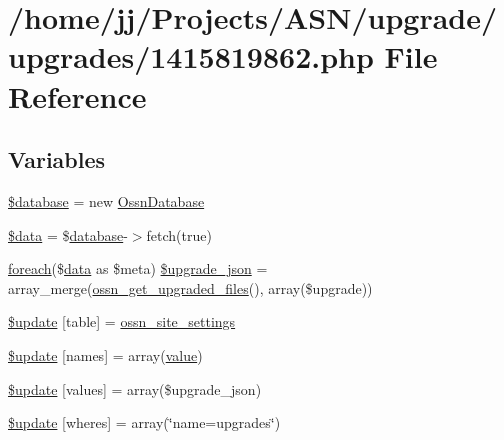\hypertarget{1415819862_8php}{}\section{/home/jj/\+Projects/\+A\+S\+N/upgrade/upgrades/1415819862.php File Reference}
\label{1415819862_8php}
\subsection*{Variables}
\begin{DoxyCompactItemize}
\item 
\hyperlink{1415819862_8php_a7691c0162d89de0b6ba47edcd8ba8878}{\$database} = new \hyperlink{class_ossn_database}{Ossn\+Database}
\item 
\hyperlink{1415819862_8php_a6efc15b5a2314dd4b5aaa556a375c6d6}{\$data} = \$\hyperlink{ossn_8config_8db_8example_8php_a4e0ca996705612048240f76ff8d4da95}{database}-\/$>$fetch(true)
\item 
\hyperlink{user__timeline_8php_a1b18c909b5f0affc85267f294d947c4b}{foreach}(\$\hyperlink{components_2_ossn_comments_2actions_2comment_2edit_8php_a2b67189b42ab547221cb2a6408f4746a}{data} as \$meta) \hyperlink{1415819862_8php_a512525d0f5eb608ac72ca7b85e5fbf65}{\$upgrade\+\_\+json} = array\+\_\+merge(\hyperlink{ossn_8lib_8upgrade_8php_a984d0f1ee4273d739939d28d00a8bedb}{ossn\+\_\+get\+\_\+upgraded\+\_\+files}(), array(\$upgrade))
\item 
\hyperlink{1415819862_8php_aee7ba5985ddf023a93862ab77e9718f9}{\$update} \mbox{[}\textquotesingle{}table\textquotesingle{}\mbox{]} = \textquotesingle{}\hyperlink{ossn_8lib_8system_8php_a610e2045b8a86c09f777b4d82e24e34c}{ossn\+\_\+site\+\_\+settings}\textquotesingle{}
\item 
\hyperlink{1415819862_8php_abcf5ad2e4fef35de04bef0168cc91ddc}{\$update} \mbox{[}\textquotesingle{}names\textquotesingle{}\mbox{]} = array(\textquotesingle{}\hyperlink{fullpage_2plugin_8min_8js_ac56c57897e10f699d124e0103921aa20}{value}\textquotesingle{})
\item 
\hyperlink{1415819862_8php_ac82a75b4c6df37380ff77c88f041785e}{\$update} \mbox{[}\textquotesingle{}values\textquotesingle{}\mbox{]} = array(\$upgrade\+\_\+json)
\item 
\hyperlink{1415819862_8php_aacde4479a904b32d0f24dea4e01f148c}{\$update} \mbox{[}\textquotesingle{}wheres\textquotesingle{}\mbox{]} = array(\char`\"{}name=\textquotesingle{}upgrades\textquotesingle{}\char`\"{})

\end{DoxyCompactItemize}
